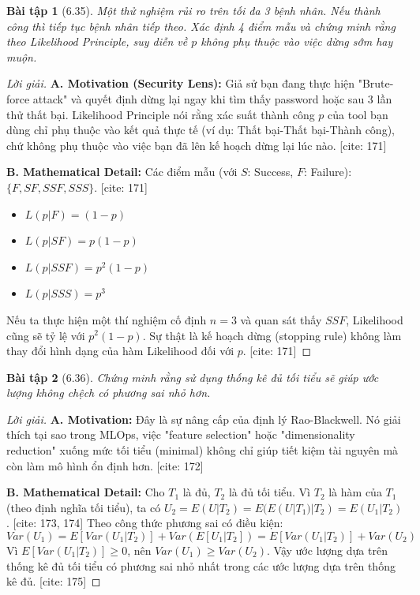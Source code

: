\documentclass[8pt,a4paper]{article}
\newtheorem{exercise}{Bài tập}
\newenvironment{solution}{\begin{proof}[Lời giải]}{\end{proof}}
\begin{document}
\begin{exercise}[6.35]
Một thử nghiệm rủi ro trên tối đa 3 bệnh nhân. Nếu thành công thì tiếp tục bệnh nhân tiếp theo. Xác định 4 điểm mẫu và chứng minh rằng theo Likelihood Principle, suy diễn về $p$ không phụ thuộc vào việc dừng sớm hay muộn.
\end{exercise}

\begin{solution}
\textbf{A. Motivation (Security Lens):} Giả sử bạn đang thực hiện "Brute-force attack" và quyết định dừng lại ngay khi tìm thấy password hoặc sau 3 lần thử thất bại. Likelihood Principle nói rằng xác suất thành công $p$ của tool bạn dùng chỉ phụ thuộc vào kết quả thực tế (ví dụ: Thất bại-Thất bại-Thành công), chứ không phụ thuộc vào việc bạn đã lên kế hoạch dừng lại lúc nào. [cite: 171]

\textbf{B. Mathematical Detail:}
Các điểm mẫu (với $S$: Success, $F$: Failure): $\{F, SF, SSF, SSS\}$. [cite: 171]
\begin{itemize}
    \item $L(p | F) = (1-p)$
    \item $L(p | SF) = p(1-p)$
    \item $L(p | SSF) = p^2(1-p)$
    \item $L(p | SSS) = p^3$
\end{itemize}
Nếu ta thực hiện một thí nghiệm cố định $n=3$ và quan sát thấy $SSF$, Likelihood cũng sẽ tỷ lệ với $p^2(1-p)$. Sự thật là kế hoạch dừng (stopping rule) không làm thay đổi hình dạng của hàm Likelihood đối với $p$. [cite: 171]
\end{solution}

\begin{exercise}[6.36]
Chứng minh rằng sử dụng thống kê đủ tối tiểu sẽ giúp ước lượng không chệch có phương sai nhỏ hơn.
\end{exercise}

\begin{solution}
\textbf{A. Motivation:} Đây là sự nâng cấp của định lý Rao-Blackwell. Nó giải thích tại sao trong MLOps, việc "feature selection" hoặc "dimensionality reduction" xuống mức tối tiểu (minimal) không chỉ giúp tiết kiệm tài nguyên mà còn làm mô hình ổn định hơn. [cite: 172]

\textbf{B. Mathematical Detail:}
Cho $T_1$ là đủ, $T_2$ là đủ tối tiểu. Vì $T_2$ là hàm của $T_1$ (theo định nghĩa tối tiểu), ta có $U_2 = E(U | T_2) = E(E(U|T_1) | T_2) = E(U_1 | T_2)$. [cite: 173, 174]
Theo công thức phương sai có điều kiện:
\[ Var(U_1) = E[Var(U_1 | T_2)] + Var(E[U_1 | T_2]) = E[Var(U_1 | T_2)] + Var(U_2) \]
Vì $E[Var(U_1 | T_2)] \ge 0$, nên $Var(U_1) \ge Var(U_2)$. 
Vậy ước lượng dựa trên thống kê đủ tối tiểu có phương sai nhỏ nhất trong các ước lượng dựa trên thống kê đủ. [cite: 175]
\end{solution}
\end{document}
